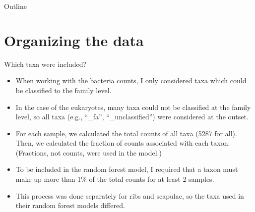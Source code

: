 \documentclass{beamer}
\date{Mar.\ 2020}
\begin{document}

\begin{frame}{Outline}
  \tableofcontents
\end{frame}








\section{Organizing the data}


\begin{frame}{Which taxa were included?}

  {\footnotesize
    \begin{itemize}
    \item When working with the bacteria counts, I only considered
      taxa which could be classified to the family level.
    \item In the case of the eukaryotes, many taxa could not be
      classified at the family level, so all taxa (e.g., ``\_fa'',
      ``\_unclassified'') were considered at the outset.
    \item For each sample, we calculated the total counts of all taxa
      (5287 for all).  Then, we calculated the fraction of counts
      associated with each taxon.  (Fractions, not counts, were used
      in the model.)
    \item To be included in the random forest model, I required that
      a taxon must make up more than 1\% of the total counts for at least
      2 samples.
     \item This process was done separately for ribs and scapulae, so
       the taxa used in their random forest models differed.
    \end{itemize}
  }
  
\end{frame}
\end{document}
